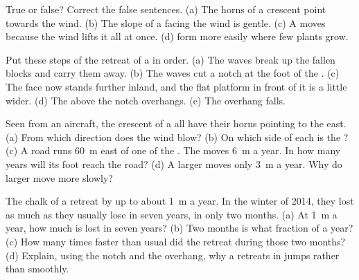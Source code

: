 \begin{exercise}[$\star$]\label{exo:g9:landforms:3}
True or false? Correct the false sentences. (a) The horns of a crescent
 point towards the wind. (b) The slope of a  facing the wind is
gentle. (c) A  moves because the wind lifts it all at once. (d) 
form more easily where few plants grow.
\end{exercise}

\begin{exercise}[$\star$]\label{exo:g9:landforms:4}
Put these steps of the retreat of a   in order. (a) The waves break
up the fallen blocks and carry them away. (b) The waves cut a notch at the
foot of the . (c) The  face now stands further inland, and the
flat platform in front of it is a little wider. (d) The  above the
notch overhangs. (e) The overhang falls.
\end{exercise}

\begin{exercise}[$\star\star$]\label{exo:g9:landforms:5}
Seen from an aircraft, the crescent  of a  all have their horns
pointing to the east. (a) From which direction does the wind blow? (b) On
which side of each  is the ? (c) A road runs \qty{60}{m} east
of one of the . The  moves \qty{6}{m} a year. In how many years
will its foot reach the road? (d) A larger  moves only \qty{3}{m} a
year. Why do larger  move more slowly?
\end{exercise}

\begin{exercise}[$\star\star$]\label{exo:g9:landforms:6}
The chalk  of a  retreat by up to about \qty{1}{m} a year. In
the winter of 2014, they lost as much as they usually lose in seven years,
in only two months. (a) At \qty{1}{m} a year, how much is lost in seven
years? (b) Two months is what fraction of a year? (c) How many times faster
than usual did the  retreat during those two months? (d) Explain,
using the notch and the overhang, why a  retreats in jumps rather
than smoothly.
\end{exercise}

